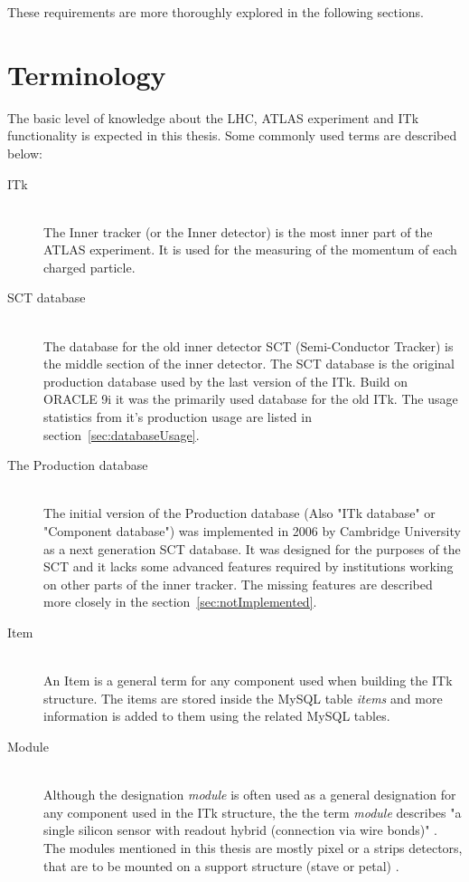 \par These requirements are more thoroughly explored in the following sections.

\section{Terminology}
\par The basic level of knowledge about the LHC, ATLAS experiment and ITk functionality is expected in this thesis. Some commonly used terms are described below:
\begin{description}
   \item[ITk] \hfil \\
		The Inner tracker (or the Inner detector) is the most inner part of the ATLAS experiment. It is used for the measuring of the momentum of each charged particle. \cite{atlasweb}
   \item[SCT database] \hfil \\
      	The database for the old inner detector
      	SCT (Semi-Conductor Tracker) is the middle section of the inner detector. \cite[17]{sverma} The SCT database is the original production database used by the last version of the ITk. Build on ORACLE 9i it was the primarily used database for the old ITk. \cite[25]{sverma} The usage statistics from it's production usage are listed in section~\ref{sec:databaseUsage}.
   \item[The Production database] \hfil \\
	The initial version of the Production database (Also "ITk database" or "Component database") was implemented in 2006 by Cambridge University as a next generation SCT database. \cite[p27]{sverma} It was designed for the purposes of the SCT and it lacks some advanced features required by institutions working on other parts of the inner tracker. The missing features are described more closely in the section~\ref{sec:notImplemented}.
	\item[Item] \hfil \\
	An Item is a general term for any component used when building the ITk structure. The items are stored inside the MySQL table \emph{items} \cite[p82]{sverma} and more information is added to them using the related MySQL tables.
	
	\item[Module] \hfil \\
	Although the designation \emph{module} is often used as a general designation for any component used in the ITk structure, the the term \emph{module} describes "a single silicon sensor with readout hybrid (connection via wire bonds)"	 \cite[slide 13]{lankfordReviewStrips}. The modules mentioned in this thesis are mostly pixel or a strips detectors, that are to be mounted on a support structure (stave or petal) \cite[slide 13]{lankfordReviewStrips}.
	

\end{description}
